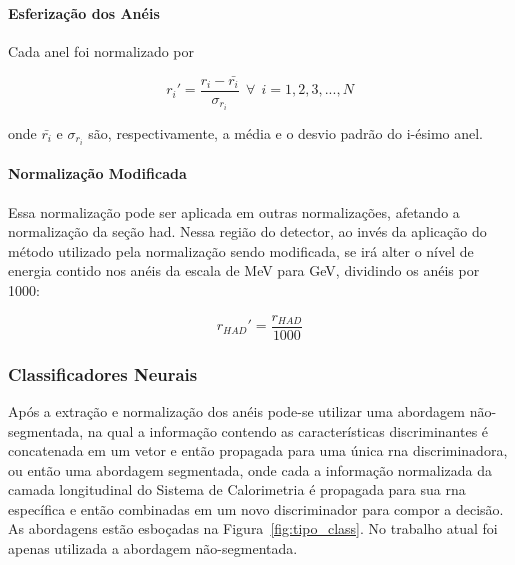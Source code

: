 \paragraph{Esferização dos Anéis}

Cada anel foi normalizado por

\begin{equation}
r_{i}' = \frac{r_i - \bar{r_i}}{\sigma_{r_i }}~~\forall~~i=1,2,3,...,N
\end{equation}

\noindent onde $\bar{r_i}$ e $\sigma_{r_i }$ são, respectivamente, a média e o desvio 
padrão do i-ésimo anel. 

\paragraph{Normalização Modificada}

Essa normalização pode ser aplicada em outras normalizações, afetando a
normalização da seção \gls{had}. Nessa região do detector, ao invés da aplicação
do método utilizado pela normalização sendo modificada, se irá alter o nível de energia 
contido nos anéis da escala de MeV para GeV, dividindo os anéis por 1000:

\begin{equation}
r_{HAD}' =   \frac{r_{HAD}}{1000}
\end{equation}



\subsubsection{Classificadores Neurais}
\label{sssec:rna}

Após a extração e normalização dos anéis pode-se utilizar uma abordagem não-segmentada, 
na qual a informação contendo as características discriminantes é concatenada em um vetor 
e então propagada para uma única \gls{rna} discriminadora, ou então uma abordagem segmentada, 
onde cada a informação normalizada da camada longitudinal do Sistema de Calorimetria é 
propagada para sua \gls{rna} específica e então combinadas em um novo
discriminador para compor a decisão. As abordagens estão esboçadas na
Figura~\ref{fig:tipo_class}. No trabalho atual foi apenas utilizada a abordagem 
não-segmentada.

